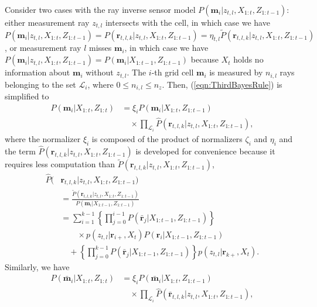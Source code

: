 \documentclass[letterpaper, 10pt, conference]{ieeeconf}
\newcommand{\refeqn}[1]{(\ref{eqn:#1})}
\begin{document}
Consider two cases with the ray inverse sensor model $P(\mathbf{m}_i|z_{t,l},X_{1:t},Z_{1:t-1})$: either measurement ray $z_{t,l}$ intersects with the cell, in which case we have $P(\mathbf{m}_i|z_{t,l},X_{1:t},Z_{1:t-1})=P(\mathbf{r}_{t,l,k}|z_{t,l},X_{1:t},Z_{1:t-1})=\eta_{t,l}\tilde P(\mathbf{r}_{t,l,k}|z_{t,l},X_{1:t},Z_{1:t-1})$, or measurement ray $l$ misses $\mathbf{m}_i$, in which case we have $P(\mathbf{m}_i|z_{t,l},X_{1:t},Z_{1:t-1})=P(\mathbf{m}_i|X_{1:t-1},Z_{1:t-1})$ because $X_t$ holds no information about $\mathbf{m}_i$ without $z_{t,l}$.
The $i$-th grid cell $\mathbf{m}_i$ is measured by $n_{i,l}$ rays belonging to the set $\mathcal L_i$, where $0\leq n_{i,l}\leq n_z$.
Then, \refeqn{ThirdBayesRule} is simplified to
\begin{align}
P(\mathbf{m}_i|X_{1:t},Z_{1:t})
&=\xi_i P(\mathbf{m}_i|X_{1:t},Z_{1:t-1})\nonumber\\&\quad\times
\prod_{\mathcal L_i}
\hat P(\mathbf{r}_{t,l,k}|z_{t,l},X_{1:t},Z_{1:t-1})
,
\label{eqn:ISM_Fusion}
\end{align}
where the normalizer $\xi_i$ is composed of the product of normalizers $\zeta_i$ and $\eta_i$ and the term $\hat P(\mathbf{r}_{t,l,k}|z_{t,l},X_{1:t},Z_{1:t-1})$ is developed for convenience because it requires less computation than $\tilde P(\mathbf{r}_{t,l,k}|z_{t,l},X_{1:t},Z_{1:t-1})$,
\begin{align}
\hat P(&\mathbf{r}_{t,l,k}|z_{t,l},X_{1:t},Z_{1:t-1})
\nonumber\\&=\frac{\tilde P(\mathbf{r}_{t,l,k}|z_{t,l},X_{1:t},Z_{1:t-1})}{P(\mathbf{m}_i|X_{1:t-1},Z_{1:t-1})}
\nonumber\\&=
\sum_{i=1}^{k-1}\left\{\prod_{j=0}^{i-1}P(\bar{\mathbf{r}}_j|X_{1:t-1},Z_{1:t-1})\right\}\nonumber\\&\quad\quad\times p(z_{t,l}|\mathbf{r}_{i+},X_t)P(\mathbf{r}_i|X_{1:t-1},Z_{1:t-1})
\nonumber\\&\quad
+
\left\{\prod_{j=0}^{k-1}P(\bar{\mathbf{r}}_j|X_{1:t-1},Z_{1:t-1})\right\}p(z_{t,l}|\mathbf{r}_{k+},X_t).
\end{align}
Similarly, we have
\begin{align}
P(\bar{\mathbf{m}}_i|X_{1:t},Z_{1:t})
&=\xi_i P(\bar{\mathbf{m}}_i|X_{1:t},Z_{1:t-1})
\nonumber\\&\quad\times\prod_{\mathcal L_i}
\hat P(\bar{\mathbf{r}}_{t,l,k}|z_{t,l},X_{1:t},Z_{1:t-1})
,
\label{eqn:ISM_Bar_Fusion}
\end{align}
\end{document}
